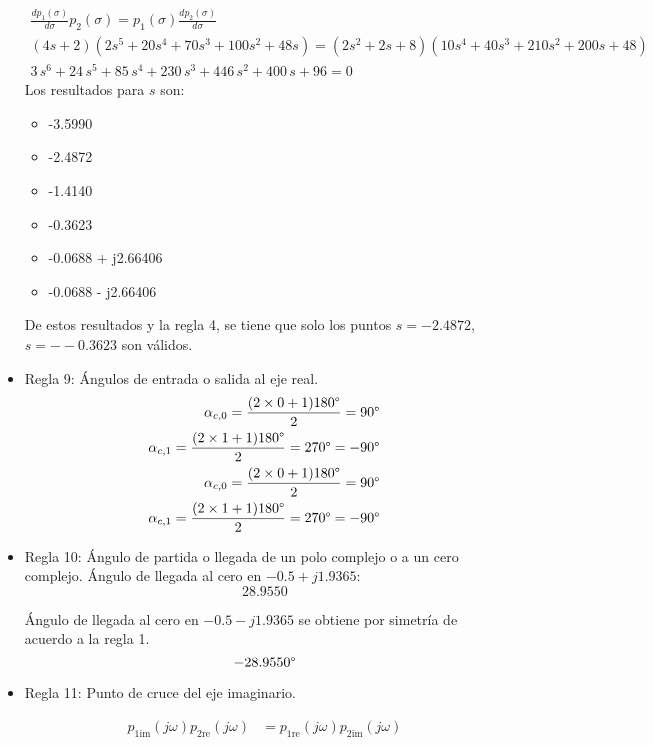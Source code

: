 \begin{itemize}
  \begin{align*}
    \frac{dp_1(\sigma)}{d\sigma} p_2(\sigma) = p_1(\sigma) \frac{dp_2(\sigma)}{d\sigma}
    \\
    (4s+2)(2s^5+20s^4+70s^3+100s^2+48s) = (2s^2+2s+8)(10s^4+40s^3+210s^2+200s+48)
    \\
    3\,s^6+24\,s^5+85\,s^4+230\,s^3+446\,s^2+400\,s+96 = 0
  \end{align*}
  Los resultados para $s$ son:
  \begin{itemize}
    \item -3.5990
    \item -2.4872
    \item -1.4140
    \item -0.3623
    \item -0.0688 + j2.66406
    \item -0.0688 - j2.66406
  \end{itemize}
  De estos resultados y la regla 4, se tiene que solo los puntos $s=-2.4872$, $s=--0.3623$ son válidos.
  \item Regla 9: Ángulos de entrada o salida al eje real.
  \begin{align*}
    \alpha_{c,0} = \frac{(2\times0+1)180\degree}{2} = 90\degree
    \\
    \alpha_{c,1} = \frac{(2\times1+1)180\degree}{2} = 270\degree = -90\degree    
    \\
    \alpha_{c,0} = \frac{(2\times0+1)180\degree}{2} = 90\degree
    \\
    \alpha_{c,1} = \frac{(2\times1+1)180\degree}{2} = 270\degree = -90\degree    
  \end{align*}
  \item Regla 10: Ángulo de partida o llegada de un polo complejo o a un cero complejo.
  Ángulo de llegada al cero en $-0.5+j1.9365$:
  \begin{equation*}
    28.9550\end{equation*}

  Ángulo de llegada al cero en $-0.5-j1.9365$ se obtiene por simetría de acuerdo a la regla 1.
  \begin{equation*}
    -28.9550\degree
  \end{equation*}
  \item Regla 11: Punto de cruce del eje imaginario.

  \begin{align*}
    p_{1\text{im}}(j\omega) p_{2\text{re}}(j\omega) &=  p_{1\text{re}}(j\omega) p_{2\text{im}}(j\omega)
  \end{align*}


\end{itemize}
